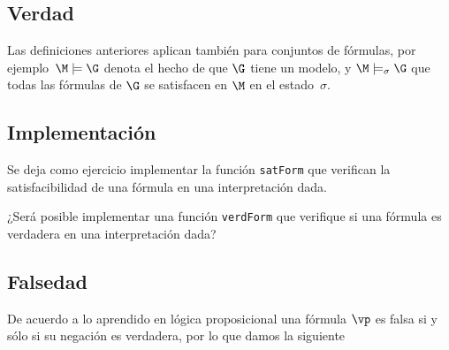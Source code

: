 \documentclass[11pt,letterpaper]{article}
\begin{document}
\subsection{Verdad}



Las definiciones anteriores aplican también para conjuntos de fórmulas, por 
ejemplo~$\M\models\G$ denota el hecho de que $\G$ tiene un modelo, y  
$\M\models_\sigma \G$ que todas las fórmulas de $\G$ se satisfacen
en $\M$ en el estado~$\sigma$.


\subsection{Implementación}

\bi
\item Se deja como ejercicio implementar la función {\tt satForm} que verifican la satisfacibilidad de una fórmula en una interpretación dada.
\item ¿Será posible implementar una función {\tt verdForm} que verifique si una fórmula es verdadera en una interpretación dada? 
\ei

\subsection{Falsedad}

De acuerdo a lo aprendido en lógica proposicional una fórmula $\vp$ es falsa
si y sólo si su negación es verdadera, por lo que damos la siguiente

\end{document}
